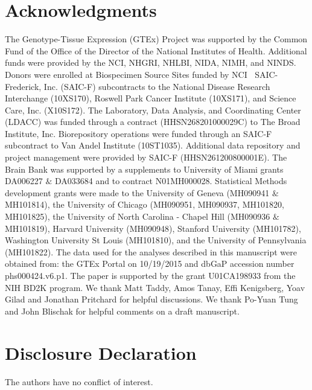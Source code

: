 \documentclass[10pt,letterpaper]{article}
\begin{document}

\section*{Acknowledgments}
The Genotype-Tissue Expression (GTEx) Project was supported by the Common Fund of the Office of the Director of the National Institutes of Health. Additional funds were provided by the NCI, NHGRI, NHLBI, NIDA, NIMH, and NINDS. Donors were enrolled at Biospecimen Source Sites funded by NCI $\ $ SAIC-Frederick, Inc. (SAIC-F) subcontracts to the National Disease Research Interchange (10XS170), Roswell Park Cancer Institute (10XS171), and Science Care, Inc. (X10S172). The Laboratory, Data Analysis, and Coordinating Center (LDACC) was funded through a contract (HHSN268201000029C) to The Broad Institute, Inc. Biorepository operations were funded through an SAIC-F subcontract to Van Andel Institute (10ST1035). Additional data repository and project management were provided by SAIC-F (HHSN261200800001E). The Brain Bank was supported by a supplements to University of Miami grants DA006227 $\&$ DA033684 and to contract N01MH000028. Statistical Methods development grants were made to the University of Geneva (MH090941 $\&$ MH101814), the University of Chicago (MH090951, MH090937, MH101820, MH101825), the University of North Carolina - Chapel Hill (MH090936 $\&$ MH101819), Harvard University (MH090948), Stanford University (MH101782), Washington University St Louis (MH101810), and the University of Pennsylvania (MH101822). The data used for the analyses described in this manuscript were obtained from: the GTEx Portal on 10/19/2015 and  dbGaP accession number phs000424.v6.p1.
The paper is supported by the grant U01CA198933 from the NIH BD2K program. We thank Matt Taddy, Amos Tanay, Effi Kenigsberg, Yoav Gilad and Jonathan Pritchard for helpful discussions. We thank Po-Yuan Tung and John Blischak for helpful comments on a draft manuscript.

\nolinenumbers



\section*{Disclosure Declaration}

The authors have no conflict of interest.

\nolinenumbers
\end{document}
